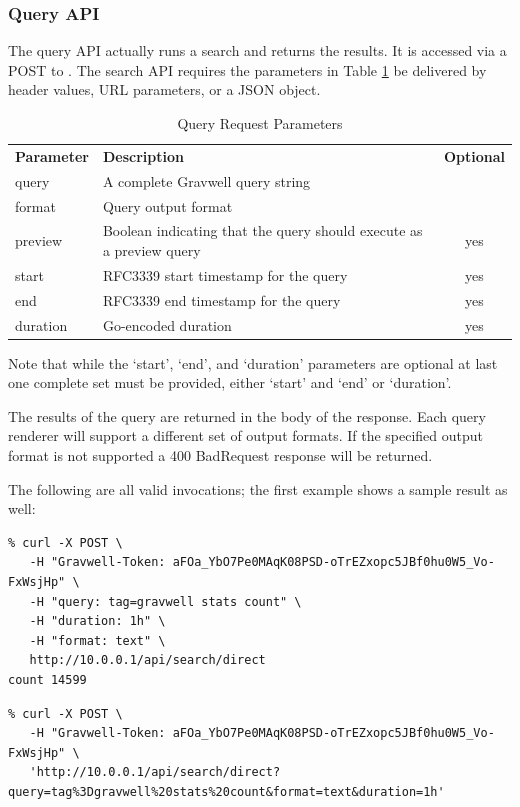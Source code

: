 \subsubsection{Query API}

The query API actually runs a search and returns the results. It is accessed via a POST to . The search API requires the parameters in Table \ref{table:query-parameters} be delivered by header values, URL parameters, or a JSON object.

\begin{table}[H]
\begin{tabular}{llc}
\hline
\textbf{Parameter} & \textbf{Description} & \textbf{Optional} \\
query     & A complete Gravwell query string & \\
format    & Query output format & \\
preview   & Boolean indicating that the query should execute as a preview query & yes \\
start     & RFC3339 start timestamp for the query & yes \\
end       & RFC3339 end timestamp for the query & yes \\
duration  & Go-encoded duration & yes \\
\end{tabular}
\caption{Query Request Parameters}
\label{table:query-parameters}
\end{table}

Note that while the `start', `end', and `duration' parameters are optional at last one complete set must be provided, either `start' and `end' or `duration'.

The results of the query are returned in the body of the response. Each query renderer will support a different set of output formats. If the specified output format is not supported a 400 BadRequest response will be returned.

The following are all valid invocations; the first example shows a sample result as well:

\begin{verbatim}
% curl -X POST \
   -H "Gravwell-Token: aFOa_YbO7Pe0MAqK08PSD-oTrEZxopc5JBf0hu0W5_Vo-FxWsjHp" \
   -H "query: tag=gravwell stats count" \
   -H "duration: 1h" \
   -H "format: text" \
   http://10.0.0.1/api/search/direct
count 14599
\end{verbatim}

\begin{verbatim}
% curl -X POST \
   -H "Gravwell-Token: aFOa_YbO7Pe0MAqK08PSD-oTrEZxopc5JBf0hu0W5_Vo-FxWsjHp" \
   'http://10.0.0.1/api/search/direct?query=tag%3Dgravwell%20stats%20count&format=text&duration=1h'
\end{verbatim}

